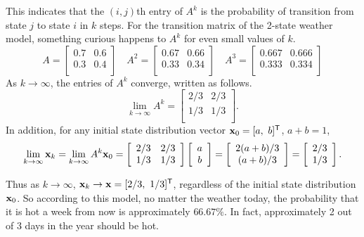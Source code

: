 This indicates that the $(i,j)$th entry of $A^k$ is the probability of transition from state $j$ to state $i$ in $k$ steps.
For the transition matrix of the 2-state weather model, something curious happens to $A^k$ for even small values of $k$.
\[
A = \left[\begin{array}{cc}
0.7 & 0.6 \\
0.3 & 0.4 \\
\end{array}\right]
\quad
A^2 = \left[\begin{array}{cc}
0.67 & 0.66 \\
0.33 & 0.34 \\
\end{array}\right]
\quad
A^3 = \left[\begin{array}{cc}
0.667 & 0.666 \\
0.333 & 0.334 \\
\end{array}\right]
\]
As $k\rightarrow\infty$, the entries of $A^k$ converge, written as follows.
\begin{equation}
\lim_{k \rightarrow \infty} A^k = \left[\begin{array}{ccc}
2/3 & 2/3 \\
1/3 & 1/3 \\
\end{array}\right].
\label{eq:markov-steady-transition}
\end{equation}
In addition, for any initial state distribution vector $\mathbf{x}_{0} = [a,\ b]^{\mathsf T}$, $a + b = 1$,
\[
\lim_{k \rightarrow \infty} \mathbf{x}_k = \lim_{k \rightarrow \infty}A^k\mathbf{x}_{0}
=
\left[\begin{array}{ccc}
2/3 & 2/3 \\
1/3 & 1/3 \\
\end{array}\right]
\left[\begin{array}{c}a\\b\end{array}\right]
=
\left[\begin{array}{c}2(a+b)/3\\(a+b)/3\end{array}\right]
=
\left[\begin{array}{c}2/3\\1/3\end{array}\right].
\]

Thus as $k\rightarrow\infty$, $\x_k \rightarrow \x = [2/3,\ 1/3]\trp$, regardless of the initial state distribution $\mathbf{x}_{0}$.
So according to this model, no matter the weather today, the probability that it is hot a week from now is approximately $66.67\%$.
In fact, approximately 2 out of 3 days in the year should be hot.

